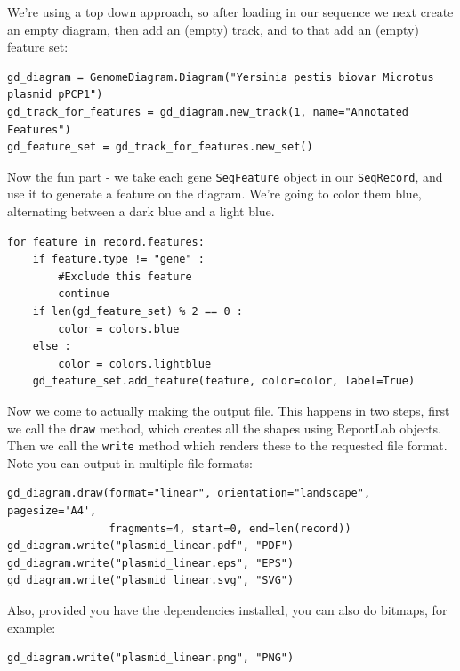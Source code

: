 \documentclass{report}
\begin{document}
We're using a top down approach, so after loading in our sequence we next
create an empty diagram, then add an (empty) track, and to that add an
(empty) feature set:

\begin{verbatim}
gd_diagram = GenomeDiagram.Diagram("Yersinia pestis biovar Microtus plasmid pPCP1")
gd_track_for_features = gd_diagram.new_track(1, name="Annotated Features")
gd_feature_set = gd_track_for_features.new_set()
\end{verbatim}

Now the fun part - we take each gene \verb|SeqFeature| object in our
\verb|SeqRecord|, and use it to generate a feature on the diagram. We're
going to color them blue, alternating between a dark blue and a light blue.
\begin{verbatim}
for feature in record.features:
    if feature.type != "gene" :
        #Exclude this feature
        continue
    if len(gd_feature_set) % 2 == 0 :
        color = colors.blue
    else :
        color = colors.lightblue
    gd_feature_set.add_feature(feature, color=color, label=True)
\end{verbatim}

Now we come to actually making the output file.  This happens in two steps,
first we call the \verb|draw| method, which creates all the shapes using
ReportLab objects.  Then we call the \verb|write| method which renders these
to the requested file format.  Note you can output in multiple file formats:

\begin{verbatim}
gd_diagram.draw(format="linear", orientation="landscape", pagesize='A4',
                fragments=4, start=0, end=len(record))
gd_diagram.write("plasmid_linear.pdf", "PDF")
gd_diagram.write("plasmid_linear.eps", "EPS")
gd_diagram.write("plasmid_linear.svg", "SVG")
\end{verbatim}

Also, provided you have the dependencies installed, you can also do bitmaps,
for example:

\begin{verbatim}
gd_diagram.write("plasmid_linear.png", "PNG")
\end{verbatim}
\end{document}
